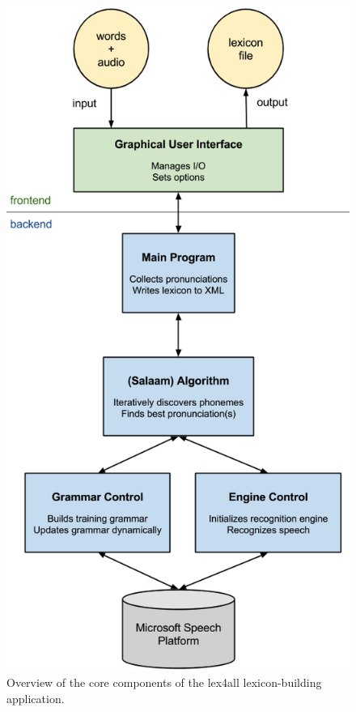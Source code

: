 \documentclass[11pt]{article}
\begin{document}
\begin{figure}[t]
\begin{center}
\includegraphics[width=\columnwidth]{../img/SystemOverview.png}
\caption{Overview of the core components of the lex4all lexicon-building application.\label{fig:system}}
\end{center}
\end{figure}
\end{document}
